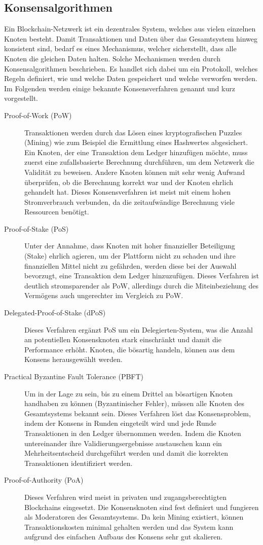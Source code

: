 \subsection{Konsensalgorithmen}
\label{subsec:fundamentals:dlt:consensus}
Ein Blockchain-Netzwerk ist ein dezentrales System, welches aus vielen einzelnen Knoten besteht. Damit Transaktionen und Daten über das Gesamtsystem hinweg konsistent sind, bedarf es eines Mechanismus, welcher sicherstellt, dass alle Knoten die gleichen Daten halten. Solche Mechanismen werden durch Konsensalgorithmen beschrieben. Es handlet sich dabei um ein Protokoll, welches Regeln definiert, wie und welche Daten gespeichert und welche verworfen werden. Im Folgenden werden einige bekannte Konsensverfahren genannt und kurz vorgestellt.
\begin{description}
  \item[Proof-of-Work (PoW)] Transaktionen werden durch das Lösen eines kryptografischen Puzzles (Mining) wie zum Beispiel die Ermittlung eines Hashwertes abgesichert. Ein Knoten, der eine Transaktion dem Ledger hinzufügen möchte, muss zuerst eine zufallsbasierte Berechnung durchführen, um dem Netzwerk die Validität zu beweisen. Andere Knoten können mit sehr wenig Aufwand überprüfen, ob die Berechnung korrekt war und der Knoten ehrlich gehandelt hat. Dieses Konsensverfahren ist meist mit einem hohen Stromverbrauch verbunden, da die zeitaufwändige Berechnung viele Ressourcen benötigt.
  \item[Proof-of-Stake (PoS)] Unter der Annahme, dass Knoten mit hoher finanzieller Beteiligung (Stake) ehrlich agieren, um der Plattform nicht zu schaden und ihre finanziellen Mittel nicht zu gefährden, werden diese bei der Auswahl bevorzugt, eine Transaktion dem Ledger hinzuzufügen. Dieses Verfahren ist deutlich stromsparender als PoW, allerdings durch die Miteinbeziehung des Vermögens auch ungerechter im Vergleich zu PoW.
  \item[Delegated-Proof-of-Stake (dPoS)] Dieses Verfahren ergänzt PoS um ein Delegierten-System, was die Anzahl an potentiellen Konsensknoten stark einschränkt und damit die Performance erhöht. Knoten, die bösartig handeln, können aus dem Konsens herausgewählt werden.
  \item[Practical Byzantine Fault Tolerance (PBFT)] Um in der Lage zu sein, bis zu einem Drittel an bösartigen Knoten handhaben zu können (Byzantinischer Fehler), müssen alle Knoten des Gesamtsystems bekannt sein. Dieses Verfahren löst das Konsensproblem, indem der Konsens in Runden eingeteilt wird und jede Runde Transaktionen in den Ledger übernommen werden. Indem die Knoten untereinander ihre Validierungsergebnisse austauschen kann ein Mehrheitsentscheid durchgeführt werden und damit die korrekten Transaktionen identifiziert werden.
  \item[Proof-of-Authority (PoA)] Dieses Verfahren wird meist in privaten und zugangsberechtigten Blockchains eingesetzt. Die Konsensknoten sind fest definiert und fungieren als Moderatoren des Gesamtsystems. Da kein Mining existiert, können Transaktionskosten minimal gehalten werden und das System kann aufgrund des einfachen Aufbaus des Konsens sehr gut skalieren.
\end{description}
